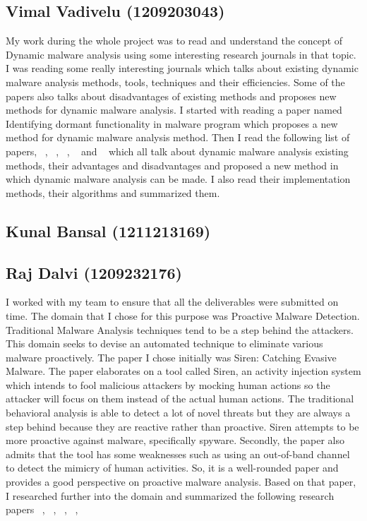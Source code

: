 \documentclass[11pt]{article}
\begin{document}
\subsection{Vimal Vadivelu (1209203043)}
My work during the whole project was to read and understand the concept of Dynamic malware analysis using some interesting research journals in that topic. I was reading some really interesting journals which talks about existing dynamic malware analysis methods, tools, techniques and their efficiencies. Some of the papers also talks about disadvantages of existing methods and proposes new methods for dynamic malware analysis. I started with reading a paper named Identifying dormant functionality in malware program which proposes a new method for dynamic malware analysis method. Then I read the following list of papers, ~\cite{irolla2016glassbox}, ~\cite{ki2015novel}, ~\cite{jerlin2015dynamic}, ~\cite{prayudi2015implementation} and ~\cite{massicotte2012testing} which all talk about dynamic malware analysis existing methods, their advantages and disadvantages and proposed a new method in which dynamic malware analysis can be made. I also read their implementation methods, their algorithms and summarized them. 



\subsection{Kunal Bansal (1211213169)}

\subsection{Raj Dalvi (1209232176)}
I worked with my team to ensure that all the deliverables were submitted on time. The domain that I chose for this purpose was Proactive Malware Detection. Traditional Malware Analysis techniques tend to be a step behind the attackers. This domain seeks to devise an automated technique to eliminate various malware proactively. The paper I chose initially was Siren: Catching Evasive Malware. The paper elaborates on a tool called Siren, an activity injection system which intends to fool malicious attackers
by mocking human actions so the attacker will focus on them instead of the actual human actions. The traditional behavioral analysis is able to detect a lot of novel threats but they are always a step behind because they are reactive rather than proactive. Siren attempts to be more proactive against malware, specifically spyware. Secondly, the paper also admits that the tool has some weaknesses such as using an out-of-band channel to detect the mimicry of human activities. So, it is a well-rounded paper and provides a good perspective on proactive malware analysis. Based on that paper, I researched further into the domain and summarized the following research papers ~\cite{cyberthreatanalysis}, ~\cite{hookscout}, ~\cite{behaviorbasedproactive}, ~\cite{softcomputingproactive}, ~\cite{nidsproactive}
	
\end{document}
